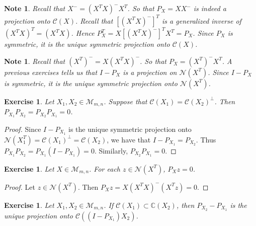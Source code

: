 \documentclass[12pt]{amsart}
\newtheorem{note}[thm]{Note}
\newtheorem{ex}[thm]{Exercise}
\newcommand{\C}{\mathbb{C}}
\newcommand{\MC}{\mathcal{C}}
\newcommand{\MN}{\mathcal{N}}
\newcommand{\MM}{\mathcal{M}}
\begin{document}
\begin{note}
Recall that $X^- = (X^TX)^-X^T$. So that $P_X = XX^-$ is indeed a projection onto $\MC(X)$. Recall that $[(X^TX)^-]^T$ is a generalized inverse of $(X^TX)^T = (X^TX)$. Hence $P_X^T = X[(X^TX)^-]^TX^T = P_X$. Since $P_X$ is symmetric, it is the unique symmetric projection onto $\MC(X)$. 
\end{note}

\begin{note}
Recall that $(X^T)^- = X(X^TX)^-$. So that $P_X = (X^T)^-X^T$. A previous exercises tells us that $I-P_X$ is a projection on $\MN(X^T)$. Since $I-P_X$ is symmetric, it is the unique symmetric projection onto $\MN(X^T)$. 
\end{note}

\begin{ex}
Let $X_1, X_2 \in \MM_{m,n}$. Suppose that $\MC(X_1) = \MC(X_2)^{\perp}$. Then $P_{X_1}P_{X_2} = P_{X_2}P_{X_1} = 0$.  
\end{ex}

\begin{proof}
Since $I-P_{X_1}$ is the unique symmetric projection onto $\MN(X_1^T) = \MC(X_1)^{\perp} = \MC(X_2)$, we have that $I-P_{X_1} = P_{X_2}$. Thus $P_{X_1}P_{X_2} = P_{X_1}(I-P_{X_1}) = 0$. Similarly, $P_{X_2}P_{X_1} = 0$.
\end{proof}

\begin{ex}
Let $X \in \MM_{m,n}$. For each $z \in \MN(X^T)$, $P_Xz = 0$.
\end{ex}

\begin{proof}
Let $z \in \MN(X^T)$. Then $P_Xz = X(X^TX)^-(X^Tz) = 0$.
\end{proof}

\begin{ex}
Let $X_1,X_2 \in \MM_{m,n}$. If $\MC(X_1) \subset \C(X_2)$, then $P_{X_2} - P_{X_1}$ is the unique projection onto $\MC((I-P_{X_1})X_2)$.
\end{ex}
\end{document}
